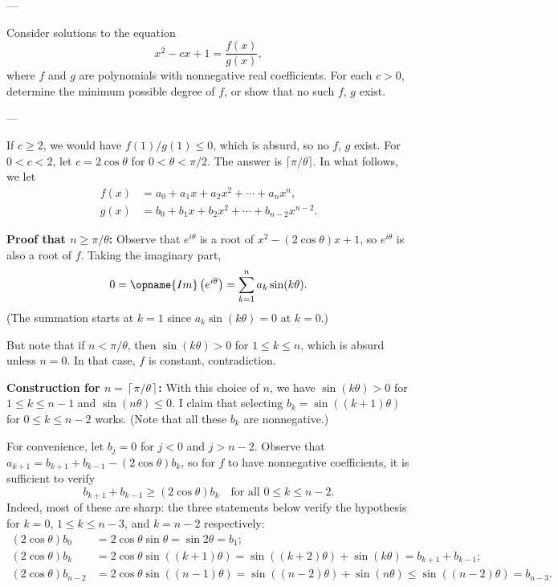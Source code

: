 
---

Consider solutions to the equation
\[x^2-cx+1=\frac{f(x)}{g(x)},\]
where $f$ and $g$ are polynomials with nonnegative real coefficients. For each $c>0$, determine the minimum possible degree of $f$, or show that no such $f$, $g$ exist.

---

If $c\ge2$, we would have $f(1)/g(1)\le0$, which is absurd, so no $f$, $g$ exist. For $0<c<2$, let $c=2\cos\theta$ for $0<\theta<\pi/2$. The answer is $\lceil\pi/\theta\rceil$. In what follows, we let
\begin{align*}
    f(x)&=a_0+a_1x+a_2x^2+\cdots+a_nx^n,\\
    g(x)&=b_0+b_1x+b_2x^2+\cdots+b_{n-2}x^{n-2}.
\end{align*}

\bigskip

\textbf{Proof that $n\ge\pi/\theta$:} Observe that $e^{i\theta}$ is a root of $x^2-(2\cos\theta)x+1$, so $e^{i\theta}$ is also a root of $f$. Taking the imaginary part,
\[0=\opname{Im}\left(e^{i\theta}\right)=\sum_{k=1}^na_k\sin(k\theta).\]
(The summation starts at $k=1$ since $a_k\sin(k\theta)=0$ at $k=0$.)

But note that if $n<\pi/\theta$, then $\sin(k\theta)>0$ for $1\le k\le n$, which is absurd unless $n=0$. In that case, $f$ is constant, contradiction.

\bigskip

\textbf{Construction for $n=\left\lceil\pi/\theta\right\rceil$:} With this choice of $n$, we have $\sin(k\theta)>0$ for $1\le k\le n-1$ and $\sin(n\theta)\le0$. I claim that selecting $b_k=\sin( (k+1)\theta)$ for $0\le k\le n-2$ works. (Note that all these $b_k$ are nonnegative.)

For convenience, let $b_j=0$ for $j<0$ and $j>n-2$. Observe that $a_{k+1}=b_{k+1}+b_{k-1}-(2\cos\theta)b_k$, so for $f$ to have nonnegative coefficients, it is sufficient to verify
\[b_{k+1}+b_{k-1}\ge(2\cos\theta)b_k\quad\text{for all }0\le k\le n-2.\]
Indeed, most of these are sharp: the three statements below verify the hypothesis for $k=0$, $1\le k\le n-3$, and $k=n-2$ respectively:
\begin{align*}
    (2\cos\theta)b_0&=2\cos\theta\sin\theta=\sin2\theta=b_1;\\
    (2\cos\theta)b_k&=2\cos\theta\sin( (k+1)\theta)=\sin( (k+2)\theta)+\sin(k\theta)=b_{k+1}+b_{k-1};\\
    (2\cos\theta)b_{n-2}&=2\cos\theta\sin( (n-1)\theta)=\sin( (n-2)\theta)+\sin(n\theta)\le\sin( (n-2)\theta)=b_{n-3}.
\end{align*}

